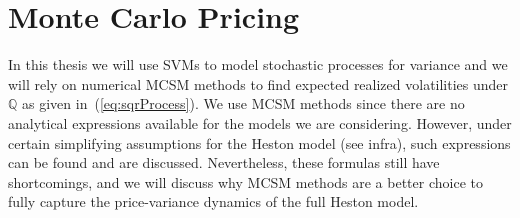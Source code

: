 
\section{Monte Carlo Pricing}

In this thesis we will use SVMs to model stochastic processes for variance and we will rely on numerical MCSM methods to find expected realized volatilities under $\mathbb{Q}$ as given in~(\ref{eq:sqrProcess}). We use MCSM methods since there are no analytical expressions available for the models we are considering. However, under certain simplifying assumptions for the Heston model (see infra), such expressions can be found and are discussed. Nevertheless, these formulas still have shortcomings, and we will discuss why MCSM methods are a better choice to fully capture the price-variance dynamics of the full Heston model.\\
